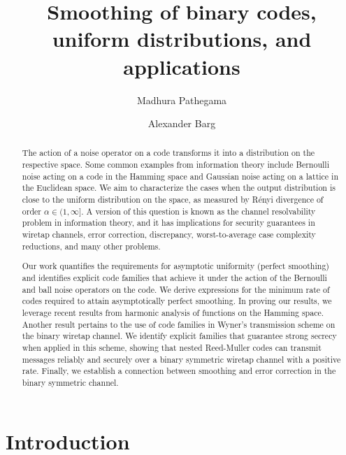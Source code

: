 \documentclass{amsart}
\title{Smoothing of binary codes, uniform distributions, and applications}
\author[]{Madhura Pathegama}\thanks{The authors are with the Department of ECE and Institute for Systems Research, University of Maryland, College Park, MD 20817. Emails: \{madhura,abarg\}@umd.edu. Research supported by NSF grants CCF-2110113 (NSF-BSF) and CCF-2104489.}
\author[]{Alexander Barg}
\theoremstyle{remark}
\begin{document}
\maketitle

\begin{abstract}

The action of a noise operator on a code transforms it into a distribution on the respective space. Some common examples from information theory include Bernoulli noise acting on a code in the Hamming space and Gaussian noise acting on a lattice in the Euclidean space. We aim to characterize the cases when the output distribution is close to the uniform distribution on the space, as measured by R{\'e}nyi divergence of order $\alpha \in (1,\infty]$.  A version of this question is known as the channel resolvability problem in information theory, and it has implications for security guarantees in wiretap channels, error correction, discrepancy, worst-to-average case complexity reductions, and many other problems. 

Our work quantifies the requirements for asymptotic uniformity (perfect smoothing) and identifies explicit code families that achieve it under the action of the Bernoulli and ball noise operators on the code. We derive expressions for the minimum rate of codes required to attain
asymptotically perfect smoothing. In proving our results, we leverage recent results from harmonic analysis of functions on the Hamming space. Another result pertains to the use of code families in Wyner's transmission scheme on the binary wiretap channel. We identify explicit families that guarantee strong secrecy when applied in this scheme, showing that nested Reed-Muller codes can transmit messages reliably and securely over a binary symmetric wiretap channel with a positive rate. Finally, we establish a connection between smoothing and error correction in the binary symmetric channel.
\end{abstract}


\section{Introduction}
\end{document}
